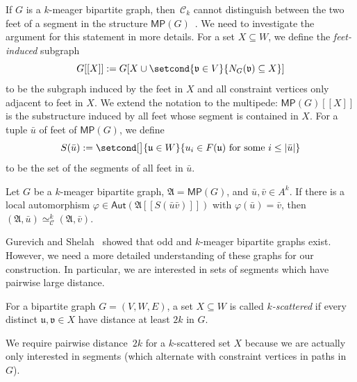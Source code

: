 \documentclass[]{lmcs}
\renewcommand{\phi}{\varphi}
\newcommand{\defining}[1]{\emph{#1}}
\newcommand{\autoA}{\phi}
\newcommand{\autGroup}[1]{\mathsf{Aut}(#1)}
\newcommand{\tup}[1]{\bar{#1}}
\newcommand{\vertA}{u}
\newcommand{\vertB}{v}
\newcommand{\StructA}{\mathfrak{A}}
\newcommand{\StructVA}{A}
\newcommand{\neighbors}[2]{N_{#1}(#2)}
\newcommand{\Ck}[1]{\mathcal{C}_{#1}}
\newcommand{\bVertA}{\mathfrak{u}}
\newcommand{\bVertB}{\mathfrak{v}}
\newcommand{\multipede}[1]{\mathsf{MP}(#1)}
\newcommand{\gadgetsb}{V}
\newcommand{\feetb}{W}
\newcommand{\footbset}{X}
\newcommand{\kequiv}[1]{\simeq^#1_{\mathcal{C}}}
\newcommand{\footinduced}[2]{#1[[#2]]}
\newcommand{\feetOf}[1]{F(#1)}
\newcommand{\segmentOf}[1]{S(#1)}
\begin{document}
If $G$ is a $k$-meager bipartite graph,
then~$\Ck{k}$ cannot distinguish between the two feet of a segment in
the structure $\multipede{G}$~\cite{GurevichShelah96}.
We need to investigate the argument for this statement in more details.
For a set $\footbset \subseteq \feetb$, we define the \defining{feet-induced} subgraph
\[\footinduced{G}{\footbset} := G[\footbset \cup \setcond{\bVertB \in \gadgetsb}{\neighbors{G}{\bVertB} \subseteq \footbset}]\]
to be the subgraph induced by the feet in $\footbset$
and all constraint vertices only adjacent to feet in $\footbset$.
We extend the notation to the multipede: $\footinduced{\multipede{G}}{\footbset}$
is the substructure induced by all feet whose segment is contained in $\footbset$.
For a tuple $\tup{\vertA}$ of feet of $\multipede{G}$,
we define
\[\segmentOf{\tup{\vertA}} := \setcond[\big]{\bVertA \in \feetb}{\vertA_i \in \feetOf{\bVertA} \text{ for some } i\leq |\tup{\vertA}|}\]
to be the set of the segments of all feet in $\tup{\vertA}$.

\begin{lemC}
	\label{lem:multipede-winning-strategy}
	Let $G$ be a $k$-meager bipartite graph,
	$\StructA = \multipede{G}$,
	and
	$\tup{\vertA},\tup{\vertB} \in \StructVA^k$.
	If there is a local automorphism $\autoA \in \autGroup{\footinduced{\StructA}{\segmentOf{\tup{\vertA}\tup{\vertB}}}}$
	with $\autoA(\tup{\vertA}) = \tup{\vertB}$,
	then $(\StructA, \tup{\vertA}) \kequiv{k} (\StructA, \tup{\vertB})$.
\end{lemC}

Gurevich and Shelah~\cite{GurevichShelah96} showed
that odd and $k$-meager bipartite graphs
exist.
However, we need a more detailed understanding of these graphs
for our construction.
In particular, we are interested in sets of segments which have pairwise large distance.

\begin{defi}[$k$-Scattered]
	For a bipartite graph $G=(\gadgetsb,\feetb,E)$,
	a set $\footbset \subseteq \feetb$ is called \defining{$k$\nobreakdash-scattered}
	if every distinct $\bVertA, \bVertB \in \footbset$ have distance at least
	$2k$ in $G$.
\end{defi}

We require pairwise distance~$2k$ for a $k$-scattered set $\footbset$
because we are actually only interested in segments
(which alternate with constraint vertices in paths in~$G$).
\end{document}
